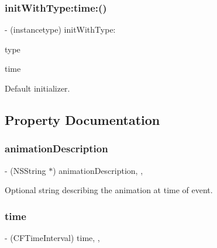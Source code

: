 \subsubsection{\texorpdfstring{init\+With\+Type\+:time\+:()}{initWithType:time:()}\hspace{0.1cm}{\footnotesize\ttfamily [2/2]}}
{\footnotesize\ttfamily -\/ (instancetype) init\+With\+Type\+: \begin{DoxyParamCaption}\item[{(P\+O\+P\+Animation\+Event\+Type)}]{type }\item[{time:(C\+F\+Time\+Interval)}]{time }\end{DoxyParamCaption}\hspace{0.3cm}{\ttfamily [implementation]}}

Default initializer. 

\subsection{Property Documentation}
\mbox{\label{interface_p_o_p_animation_event_a89b37f5524d6ec635e5b0fea936fc703}} 
\subsubsection{\texorpdfstring{animation\+Description}{animationDescription}}
{\footnotesize\ttfamily -\/ (N\+S\+String $\ast$) animation\+Description\hspace{0.3cm}{\ttfamily [read]}, {\ttfamily [nonatomic]}, {\ttfamily [copy]}}

Optional string describing the animation at time of event. \mbox{\label{interface_p_o_p_animation_event_a73554321ba6985a09a04a4e784fbaed4}} 
\subsubsection{\texorpdfstring{time}{time}}
{\footnotesize\ttfamily -\/ (C\+F\+Time\+Interval) time\hspace{0.3cm}{\ttfamily [read]}, {\ttfamily [nonatomic]}, {\ttfamily [assign]}}

